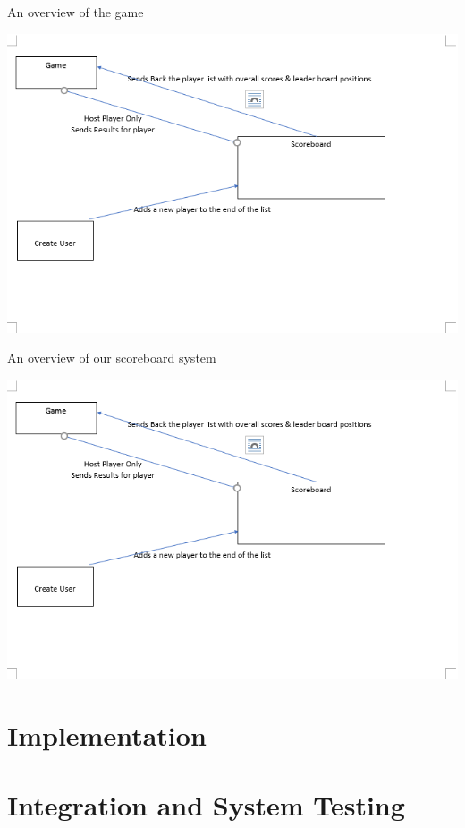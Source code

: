 An overview of the game

\includegraphics[width=1\columnwidth]{img/MariaDBPic.PNG}

An overview of our scoreboard system

\includegraphics[width=1\columnwidth]{img/MariaDBPic.PNG}

\newpage
\section{Implementation}

\newpage
\section{Integration and System Testing}
